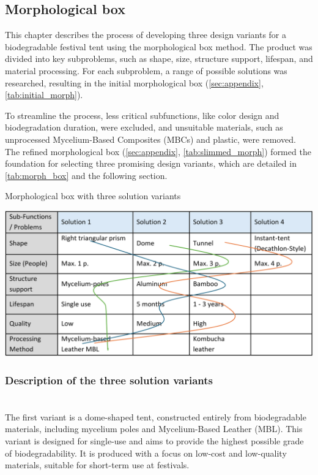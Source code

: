 \documentclass{article}
\newcommand{\pph}[1]{\paragraph{#1} \phantom{}\\}
\begin{document}
\subsection{Morphological box}
This chapter describes the process of developing three design variants for a
biodegradable festival tent using the morphological box method. The product was divided
into key subproblems, such as shape, size, structure support, lifespan, and material
processing. For each subproblem, a range of possible solutions was researched,
resulting in the initial morphological box (\autoref{sec:appendix}, \autoref{tab:initial_morph}).

To streamline the process, less critical subfunctions, like color design and
biodegradation duration, were excluded, and unsuitable materials, such as unprocessed
Mycelium-Based Composites (MBCs) and plastic, were removed. The refined
morphological box (\autoref{sec:appendix}, \autoref{tab:slimmed_morph}) formed the foundation
for selecting three promising design variants, which are detailed in \autoref{tab:morph_box}
and the following section. 

\begin{table}[ht!]
    \centering
    \caption{Morphological box with three solution variants}
    \includegraphics[width=.85\textwidth]{media/morph_box.png}
    \label{tab:morph_box}
\end{table}

\subsubsection{Description of the three solution variants}
\pph{\color{newgreen}{Variant 1: Dome tent (Single use, Fully biodegradable)}}
The first variant is a dome-shaped tent, constructed entirely from biodegradable materials,
including mycelium poles and Mycelium-Based Leather (MBL). This variant is designed for
single-use and aims to provide the highest possible grade of biodegradability. It is produced
with a focus on low-cost and low-quality materials, suitable for short-term use at festivals.
\end{document}
